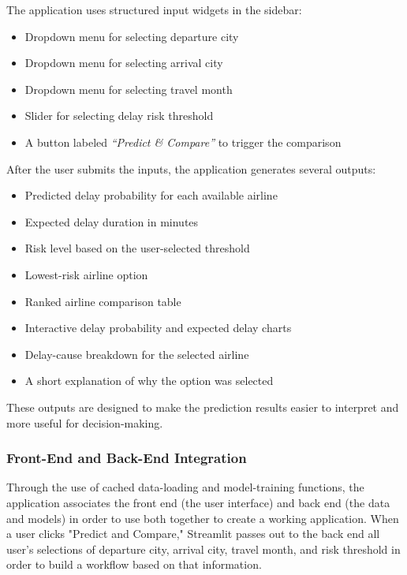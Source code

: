 The application uses structured input widgets in the sidebar:

\begin{itemize}
    \item Dropdown menu for selecting departure city
    \item Dropdown menu for selecting arrival city
    \item Dropdown menu for selecting travel month
    \item Slider for selecting delay risk threshold
    \item A button labeled \textit{``Predict \& Compare''} to trigger the comparison
\end{itemize}

After the user submits the inputs, the application generates several outputs:

\begin{itemize}
    \item Predicted delay probability for each available airline
    \item Expected delay duration in minutes
    \item Risk level based on the user-selected threshold
    \item Lowest-risk airline option
    \item Ranked airline comparison table
    \item Interactive delay probability and expected delay charts
    \item Delay-cause breakdown for the selected airline
    \item A short explanation of why the option was selected
\end{itemize}

These outputs are designed to make the prediction results easier to interpret and more useful for decision-making.

\subsubsection{Front-End and Back-End Integration}

Through the use of cached data-loading and model-training functions, the application associates the front end (the user interface) and back end (the data and models) in order to use both together to create a working application. When a user clicks "Predict and Compare," Streamlit passes out to the back end all user's selections of departure city, arrival city, travel month, and risk threshold in order to build a workflow based on that information.

